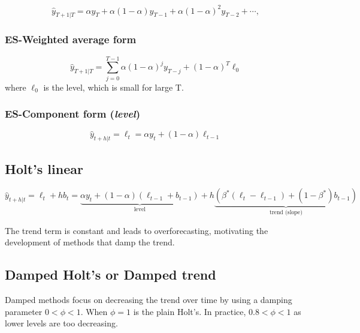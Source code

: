 \documentclass{article}
\begin{document}
\begin{equation}
  \hat{y}_{T+1|T} = \alpha y_T + \alpha(1-\alpha) y_{T-1} + \alpha(1-\alpha)^2 y_{T-2}+ \cdots,   \tag{7.1}
\label{eqn::exp_smoothing}
\end{equation}

\subsubsection{ES-Weighted average form}

\begin{equation}
\hat{y}_{T+1|T} =  \sum_{j=0}^{T-1} \alpha(1-\alpha)^j y_{T-j} + (1-\alpha)^T \ell_{0}
\label{eqn::exp_smoothing_wa}
\end{equation}
where $\ell_{0}$ is the level, which is small for large T.

\subsubsection{ES-Component form (\textit{level})}

\begin{equation}
\hat{y}_{t+h|t} = \ell_{t} = \alpha y_{t} + (1 - \alpha)\ell_{t-1}
\label{eqn::exp_smoothing_cmp}
\end{equation}


\subsection{Holt's linear}

\begin{equation}
\hat{y}_{t+h|t} = \ell_{t} + hb_{t} = \underbrace{\alpha y_{t} + (1 - \alpha)(\ell_{t-1} + b_{t-1})}_\text{level} + h\underbrace{(\beta^*(\ell_{t} - \ell_{t-1}) + (1 -\beta^*)b_{t-1})}_\text{trend (slope)}
\label{eqn:holts_linear}
\end{equation}

The trend term is constant and leads to overforecasting, motivating the development of methods that damp the trend.

\subsection{Damped Holt's or Damped trend}

Damped methods focus on decreasing the trend over time by using a damping parameter $0<\phi<1$. When $\phi=1$ is the plain Holt's. In practice, $0.8<\phi<1$ as lower levels are too decreasing.
\end{document}
